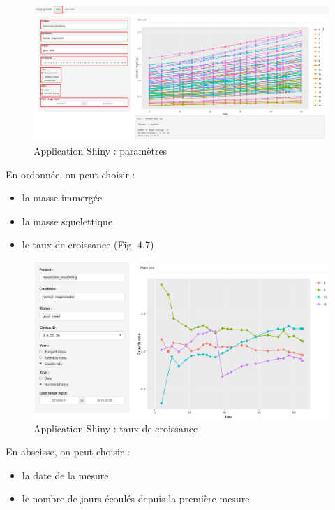 \documentclass[]{article}
\providecommand{\tightlist}{%
  \setlength{\itemsep}{0pt}\setlength{\parskip}{0pt}}
\begin{document}
\begin{figure}
\centering
\includegraphics[width=15.00000cm]{../image/notebook-plot2.PNG}
\caption{Application Shiny : paramètres}
\end{figure}

\vspace{0.5cm}

En ordonnée, on peut choisir :

\begin{itemize}
\tightlist
\item
  la masse immergée
\item
  la masse squelettique
\item
  le taux de croissance (Fig. 4.7) 
\end{itemize}

\begin{figure}[h!]
\includegraphics[]{../image/taux-croissance.PNG}
\caption{Application Shiny : taux de croissance}
\end{figure}

En abscisse, on peut choisir :

\begin{itemize}
\tightlist
\item
  la date de la mesure
\item
  le nombre de jours écoulés depuis la première mesure
\end{itemize}
\end{document}
